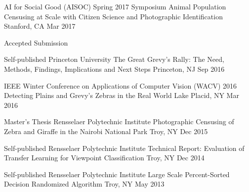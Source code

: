 

\begin{cventries}

  \cventry
    {AI for Social Good (AISOC) Spring 2017 Symposium} %
    {Animal Population Censusing at Scale with Citizen Science and Photographic Identification} %
    {Stanford, CA} %
    {Mar 2017} %
    {
     \begin{cvitems}
        \item {Accepted Submission}
      \end{cvitems}
    }

  \cventryshort
    {Self-published \dotSep Princeton University} %
    {The Great Grevy’s Rally: The Need, Methods, Findings, Implications and Next Steps} %
    {Princeton, NJ} %
    {Sep 2016} %

  \cventryshort
    {IEEE Winter Conference on Applications of Computer Vision (WACV) 2016} %
    {Detecting Plains and Grevy's Zebras in the Real World} %
    {Lake Placid, NY} %
    {Mar 2016} %

  \cventryshort
    {Master's Thesis \dotSep Rensselaer Polytechnic Institute} %
    {Photographic Censusing of Zebra and Giraffe in the Nairobi National Park} %
    {Troy, NY} %
    {Dec 2015} %

  \cventryshort
    {Self-published \dotSep Rensselaer Polytechnic Institute} %
    {Technical Report: Evaluation of Transfer Learning for Viewpoint Classification} %
    {Troy, NY} %
    {Dec 2014} %

  \cventryshort
    {Self-published \dotSep Rensselaer Polytechnic Institute} %
    {Large Scale Percent-Sorted Decision Randomized Algorithm} %
    {Troy, NY} %
    {May 2013} %

\end{cventries}
